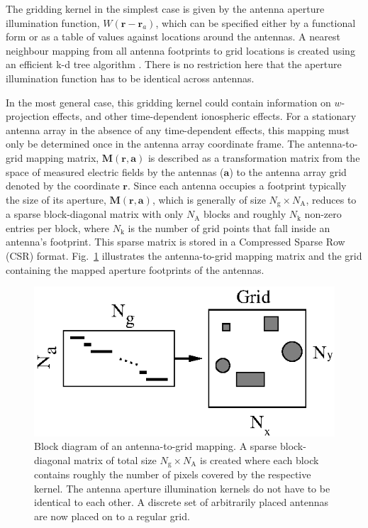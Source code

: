 \documentclass[a4paper,fleqn,usenatbib]{mnras}
\newcommand{\Nant}{N_\textrm{A}}
\newcommand{\Ngrid}{N_\textrm{g}}
\begin{document}
The gridding kernel in the simplest case is given by the antenna aperture illumination function, $W(\mathbf{r}-\mathbf{r}_a)$, which can be specified either by a functional form or as a table of values against locations around the antennas. A nearest neighbour mapping from all antenna footprints to grid locations is created using an efficient k-d tree algorithm \citep{man99}. There is no restriction here that the aperture illumination function has to be identical across antennas. 

In the most general case, this gridding kernel could contain information on $w$-projection effects, and other time-dependent ionospheric effects. For a stationary antenna array in the absence of any time-dependent effects, this mapping must only be determined once in the antenna array coordinate frame. The antenna-to-grid mapping matrix, $\mathbf{M}(\mathbf{r},\mathbf{a})$ is described as a transformation matrix from the space of measured electric fields by the antennas ($\mathbf{a}$) to the antenna array grid denoted by the coordinate $\mathbf{r}$. Since each antenna occupies a footprint typically the size of its aperture, $\mathbf{M}(\mathbf{r},\mathbf{a})$, which is generally of size $\Ngrid\times \Nant$, reduces to a sparse block-diagonal matrix with only $\Nant$ blocks and roughly $N_\textrm{k}$ non-zero entries per block, where $N_\textrm{k}$ is the number of grid points that fall inside an antenna's footprint. This sparse matrix is stored in a Compressed Sparse Row (CSR) format. Fig.~\ref{fig:a2g-mapping} illustrates the antenna-to-grid mapping matrix and the grid containing the mapped aperture footprints of the antennas.

\begin{figure}
  \includegraphics[width=\columnwidth]{figure3}
  \caption{Block diagram of an antenna-to-grid mapping. A sparse block-diagonal     matrix of total size $\Ngrid\times \Nant$ is created where each block contains roughly the number of pixels covered by the respective kernel. The antenna aperture illumination kernels do not have to be identical to each other. A discrete set of arbitrarily placed antennas are now placed on to a regular grid.}
  \label{fig:a2g-mapping}
\end{figure}
\end{document}
